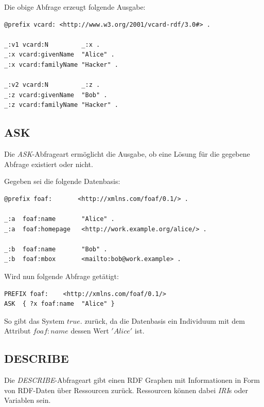 Die obige Abfrage erzeugt folgende Ausgabe:
\begin{lstlisting}
@prefix vcard: <http://www.w3.org/2001/vcard-rdf/3.0#> .

_:v1 vcard:N         _:x .
_:x vcard:givenName  "Alice" .
_:x vcard:familyName "Hacker" .

_:v2 vcard:N         _:z .
_:z vcard:givenName  "Bob" .
_:z vcard:familyName "Hacker" .
\end{lstlisting}

\subsection{ASK}
\label{subsec:sparql_abfragearten_ask}
Die \textit{ASK}-Abfrageart ermöglicht die Ausgabe, ob eine Lösung für die gegebene Abfrage existiert oder nicht.

Gegeben sei die folgende Datenbasis:
\lstset{language=XML}
\begin{lstlisting}
@prefix foaf:       <http://xmlns.com/foaf/0.1/> .

_:a  foaf:name       "Alice" .
_:a  foaf:homepage   <http://work.example.org/alice/> .

_:b  foaf:name       "Bob" .
_:b  foaf:mbox       <mailto:bob@work.example> .
\end{lstlisting}

Wird nun folgende Abfrage getätigt:
\lstset{language=XML}
\begin{lstlisting}
PREFIX foaf:    <http://xmlns.com/foaf/0.1/>
ASK  { ?x foaf:name  "Alice" }
\end{lstlisting}
So gibt das System $true.$ zurück, da die Datenbasis ein Individuum mit dem Attribut $foaf:name$ dessen Wert $'Alice'$ ist.

\subsection{DESCRIBE}
\label{subsec:sparql_abfragearten_describe}
Die \textit{DESCRIBE}-Abfrageart gibt einen RDF Graphen mit Informationen in Form von RDF-Daten über Ressourcen zurück. Ressourcen können dabei \textit{IRI}s oder Variablen sein.

